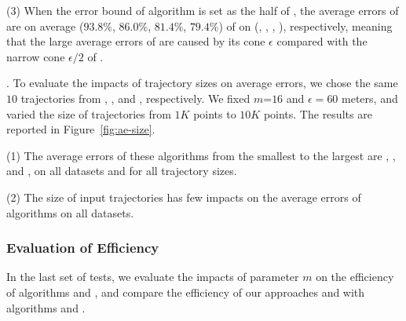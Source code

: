 \ni(3) When the error bound of algorithm \cista is set as the half of \cist, the average errors of \cista are on average ($93.8\%$, $86.0\%$, $81.4\%$, {$79.4\%$}) of \cist on (\truck, \sercar, \geolife, \pricar), respectively, meaning that the large average errors of \cista are caused by its cone \wrt $\epsilon$ compared with the narrow cone \wrt $\epsilon/2$ of \cist.


.
To evaluate the impacts of trajectory sizes on average errors, we chose the same {$10$} trajectories from \truck, \sercar, \geolife and \pricar, respectively.
We fixed {$m$=$16$} and $\epsilon = 60$ meters, and varied the size  of trajectories from $1K$ points to $10K$ points.
%
The results are reported in Figure~\ref{fig:ae-size}.

\ni(1) The average errors of these algorithms from the smallest to the largest are \squishe, \dps, \cist and \cista, on all datasets and for all trajectory sizes. %

\ni(2) The size of input trajectories has few impacts on the average errors of \lsa algorithms on all datasets.




\subsubsection{Evaluation of Efficiency}


In the last set of tests, we evaluate the impacts of parameter $m$ on the efficiency of algorithms \cist and \cista, and compare the efficiency of our approaches \cist and \cista with algorithms \dps and \squishe.
%


